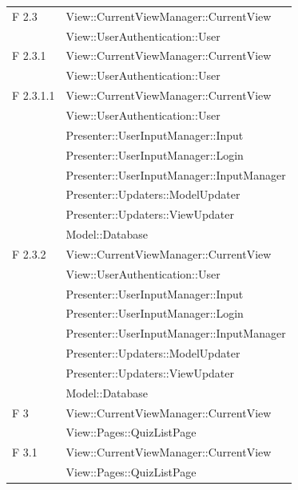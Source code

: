 \documentclass[a4paper,11pt]{article}
\begin{document}
\begin{longtable}{p{}p{}}
F 2.3 & View::CurrentViewManager::CurrentView\\
			& View::UserAuthentication::User\\
\midrule
F 2.3.1 & View::CurrentViewManager::CurrentView\\
		& View::UserAuthentication::User\\
\midrule
F 2.3.1.1 & View::CurrentViewManager::CurrentView\\
			& View::UserAuthentication::User\\
			& Presenter::UserInputManager::Input\\
			& Presenter::UserInputManager::Login\\
			& Presenter::UserInputManager::InputManager\\
			& Presenter::Updaters::ModelUpdater\\
			& Presenter::Updaters::ViewUpdater\\
			& Model::Database\\
\midrule
F 2.3.2 & View::CurrentViewManager::CurrentView\\
			& View::UserAuthentication::User\\
			& Presenter::UserInputManager::Input\\
			& Presenter::UserInputManager::Login\\
			& Presenter::UserInputManager::InputManager\\
			& Presenter::Updaters::ModelUpdater\\
			& Presenter::Updaters::ViewUpdater\\
			& Model::Database\\
\midrule
F 3 & View::CurrentViewManager::CurrentView\\
			& View::Pages::QuizListPage\\
\midrule
F 3.1 & View::CurrentViewManager::CurrentView\\
			& View::Pages::QuizListPage\\
\midrule


\end{longtable}
\end{document}
